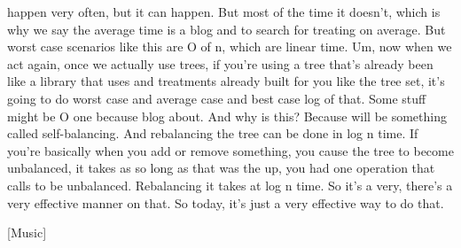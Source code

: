 happen very often, but it can happen. But most of the time it doesn't, which is why we say the average time is a blog and to search for treating on average. But worst case scenarios like this are O of n, which are linear time. Um, now when we act again, once we actually use trees, if you're using a tree that's already been like a library that uses and treatments already built for you like the tree set, it's going to do worst case and average case and best case log of that. Some stuff might be O one because blog about. And why is this? Because will be something called self-balancing. And rebalancing the tree can be done in log n time. If you're basically when you add or remove something, you cause the tree to become unbalanced, it takes as so long as that was the up, you had one operation that calls to be unbalanced. Rebalancing it takes at log n time. So it's a very, there's a very effective manner on that. So today, it's just a very effective way to do that.

[Music]

